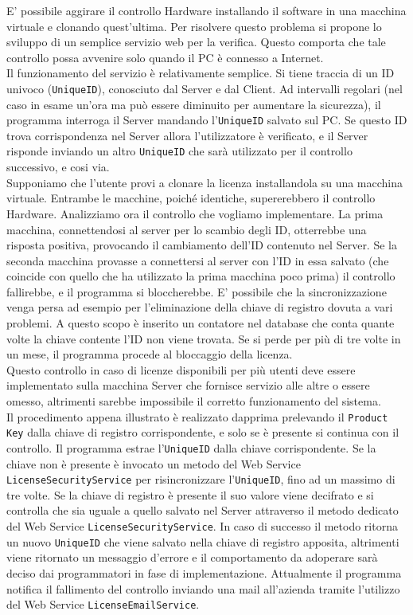 E' possibile aggirare il controllo Hardware installando il software in una macchina virtuale e clonando quest'ultima. Per risolvere questo problema si propone lo sviluppo di un semplice servizio web per la verifica. Questo comporta che tale controllo possa avvenire solo quando il PC è connesso a Internet.\\
Il funzionamento del servizio è relativamente semplice. Si tiene traccia di un ID univoco (\texttt{UniqueID}), conosciuto dal Server e dal Client. Ad intervalli regolari (nel caso in esame un’ora ma può essere diminuito per aumentare la sicurezza), il programma interroga il Server mandando l'\texttt{UniqueID} salvato sul PC. Se questo ID trova corrispondenza nel Server allora l'utilizzatore è verificato, e il Server risponde inviando un altro \texttt{UniqueID} che sarà utilizzato per il controllo successivo, e cosi via.
\\Supponiamo che l'utente provi a clonare la licenza installandola su una macchina virtuale. Entrambe le macchine, poiché identiche, supererebbero il controllo Hardware. Analizziamo ora il controllo che vogliamo implementare. La prima macchina, connettendosi al server per lo scambio degli ID, otterrebbe una risposta positiva, provocando il cambiamento dell'ID contenuto nel Server. Se la seconda macchina provasse a connettersi al server con l'ID in essa salvato (che coincide con quello che ha utilizzato la prima macchina poco prima) il controllo fallirebbe, e il programma si bloccherebbe. E' possibile che la sincronizzazione venga persa ad esempio per l'eliminazione della chiave di registro dovuta a vari problemi. A questo scopo è inserito un contatore nel database che conta quante volte la chiave contente l'ID non viene trovata. Se si perde per più di tre volte in un mese, il programma procede al bloccaggio della licenza.\\
Questo controllo in caso di licenze disponibili per più utenti deve essere implementato sulla macchina Server che fornisce servizio alle altre o essere omesso, altrimenti sarebbe impossibile il corretto funzionamento del sistema.\\
Il procedimento appena illustrato è realizzato dapprima prelevando il \texttt{Product Key} dalla chiave di registro corrispondente, e solo se è presente si continua con il controllo. Il programma estrae l'\texttt{UniqueID} dalla chiave corrispondente. Se la chiave non è presente è invocato un metodo del Web Service \texttt{LicenseSecurityService} per risincronizzare l’\texttt{UniqueID}, fino ad un massimo di tre volte. Se la chiave di registro è presente il suo valore viene decifrato e si controlla che sia uguale a quello salvato nel Server attraverso il metodo dedicato del Web Service \texttt{LicenseSecurityService}. In caso di successo il metodo ritorna un nuovo \texttt{UniqueID} che viene salvato nella chiave di registro apposita, altrimenti viene ritornato un messaggio d’errore e il comportamento da adoperare sarà deciso dai programmatori in fase di implementazione. Attualmente il programma notifica il fallimento del controllo inviando una mail all'azienda tramite l'utilizzo del Web Service \texttt{LicenseEmailService}. 


